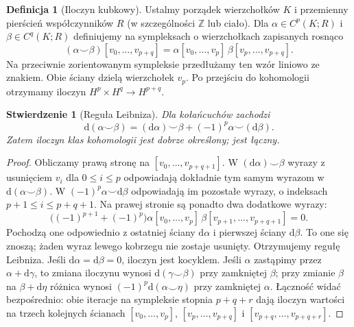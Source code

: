 \documentclass[11pt,a4paper,oneside]{report}
\newcommand{\Z}{\mathbb{Z}}
\newcommand{\dd}{\mathrm d}
\theoremstyle{plain}
\newtheorem{stwierdzenie}[twierdzenie]{Stwierdzenie}
\theoremstyle{definition}
\newtheorem{definicja}[twierdzenie]{Definicja}
\theoremstyle{remark}
\begin{document}
\begin{definicja}[Iloczyn kubkowy]
\label{def:kubek-16}
Ustalmy porządek wierzchołków $K$ i przemienny
pierścień współczynników $R$ (w szczególności $\Z$ lub ciało).
Dla $\alpha\in C^p(K;R)$ i $\beta\in C^q(K;R)$ definiujemy
na sympleksach o wierzchołkach zapisanych rosnąco
\[
(\alpha\smile\beta)
 [v_0,\ldots,v_{p+q}]
=\alpha[v_0,\ldots,v_p]\,
 \beta[v_p,\ldots,v_{p+q}].
\]
Na przeciwnie zorientowanym sympleksie przedłużamy ten
wzór liniowo ze znakiem. Obie ściany dzielą wierzchołek $v_p$.
Po przejściu do kohomologii otrzymamy
iloczyn $H^p\times H^q\to H^{p+q}$.
\end{definicja}

\begin{stwierdzenie}[Reguła Leibniza]
\label{prop:kubek-leibniz-16}
Dla kołańcuchów zachodzi
\[
 \dd(\alpha\smile\beta)
 =(\dd\alpha)\smile\beta
       +(-1)^p\alpha\smile(\dd\beta).
\]
Zatem iloczyn klas kohomologii jest
dobrze określony; jest łączny.
\end{stwierdzenie}
\begin{proof}
Obliczamy prawą stronę na $[v_0,\ldots,v_{p+q+1}]$.
W $(\dd\alpha)\smile\beta$ wyrazy z usunięciem
$v_i$ dla $0\leq i\leq p$ odpowiadają dokładnie
tym samym wyrazom w $\dd(\alpha\smile\beta)$.
W $(-1)^p\alpha\smile\dd\beta$ odpowiadają im
pozostałe wyrazy, o indeksach $p+1\leq i\leq p+q+1$.
Na prawej stronie są ponadto dwa dodatkowe wyrazy:
\[
 \bigl((-1)^{p+1}+(-1)^p\bigr)
 \alpha[v_0,\ldots,v_p]\,
 \beta[v_{p+1},\ldots,v_{p+q+1}]=0.
\]
Pochodzą one odpowiednio z ostatniej ściany
$\dd\alpha$ i pierwszej ściany $\dd\beta$.
To one się znoszą; żaden wyraz lewego kobrzegu
nie zostaje usunięty. Otrzymujemy regułę Leibniza.
Jeśli $\dd\alpha=\dd\beta=0$,
iloczyn jest kocyklem.
Jeśli $\alpha$ zastąpimy przez
$\alpha+\dd\gamma$, to zmiana
iloczynu wynosi
$\dd(\gamma\smile\beta)$
przy zamkniętej $\beta$;
przy zmianie $\beta$ na $\beta+\dd\eta$ różnica
wynosi $(-1)^p\dd(\alpha\smile\eta)$ przy zamkniętej $\alpha$.
Łączność widać bezpośrednio:
obie iteracje na sympleksie
stopnia $p+q+r$ dają iloczyn
wartości na trzech kolejnych
ścianach
$[v_0,\ldots,v_p]$,
$[v_p,\ldots,v_{p+q}]$ i
$[v_{p+q},\ldots,v_{p+q+r}]$.
\end{proof}
\end{document}
